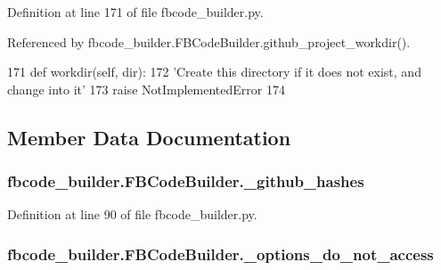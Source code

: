Definition at line 171 of file fbcode\+\_\+builder.\+py.



Referenced by fbcode\+\_\+builder.\+F\+B\+Code\+Builder.\+github\+\_\+project\+\_\+workdir().


\begin{DoxyCode}
171     \textcolor{keyword}{def }workdir(self, dir):
172         \textcolor{stringliteral}{'Create this directory if it does not exist, and change into it'}
173         \textcolor{keywordflow}{raise} NotImplementedError
174 
\end{DoxyCode}


\subsection{Member Data Documentation}
\subsubsection[{\+\_\+github\+\_\+hashes}]{\setlength{\rightskip}{0pt plus 5cm}fbcode\+\_\+builder.\+F\+B\+Code\+Builder.\+\_\+github\+\_\+hashes\hspace{0.3cm}{\ttfamily [private]}}\label{classfbcode__builder_1_1FBCodeBuilder_a8de20d1f7b20927139a79f0fd6076057}


Definition at line 90 of file fbcode\+\_\+builder.\+py.

\subsubsection[{\+\_\+options\+\_\+do\+\_\+not\+\_\+access}]{\setlength{\rightskip}{0pt plus 5cm}fbcode\+\_\+builder.\+F\+B\+Code\+Builder.\+\_\+options\+\_\+do\+\_\+not\+\_\+access\hspace{0.3cm}{\ttfamily [private]}}\label{classfbcode__builder_1_1FBCodeBuilder_a9619842a6e9fcb3113f0b88bca07e914}



